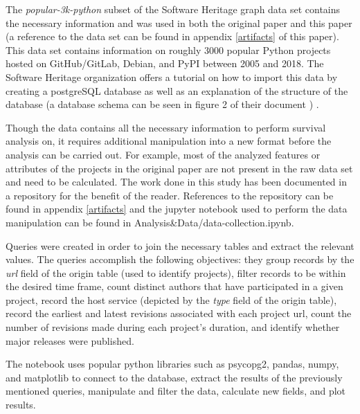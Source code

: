 \documentclass[acmconf]{acmart}
\begin{document}
The \emph{popular-3k-python} subset of the Software Heritage graph data set \cite{pietri2019software} contains the necessary information and was used in both the original paper and this paper (a reference to the data set can be found in appendix \ref{artifacts} of this paper).
This data set contains information on roughly 3000 popular Python projects hosted on GitHub/GitLab, Debian, and PyPI between 2005 and 2018.
The Software Heritage organization offers a tutorial on how to import this data by creating a postgreSQL database \cite{SQLdataset} as well as an explanation of the structure of the database (a database schema can be seen in figure 2 of their document \cite{pietri2019software}) .

Though the data contains all the necessary information to perform survival analysis on, it requires additional manipulation into a new format before the analysis can be carried out. 
For example, most of the analyzed features or attributes of the projects in the original paper are not present in the raw data set and need to be calculated.
The work done in this study has been documented in a repository for the benefit of the reader.
References to the repository can be found in appendix \ref{artifacts} and the jupyter notebook used to perform the data manipulation can be found in Analysis\&Data/data-collection.ipynb.

Queries were created in order to join the necessary tables and extract the relevant values.
The queries accomplish the following objectives: they group records by the \emph{url} field of the origin table (used to identify projects), filter records to be within the desired time frame, count distinct authors that have participated in a given project, record the host service (depicted by the \emph{type} field of the origin table), record the earliest and latest revisions associated with each project url, count the number of revisions made during each project's duration, and identify whether major releases were published.

The notebook uses popular python libraries such as psycopg2, pandas, numpy, and matplotlib to connect to the database, extract the results of the previously mentioned queries, manipulate and filter the data, calculate new fields, and plot results. 
\end{document}
